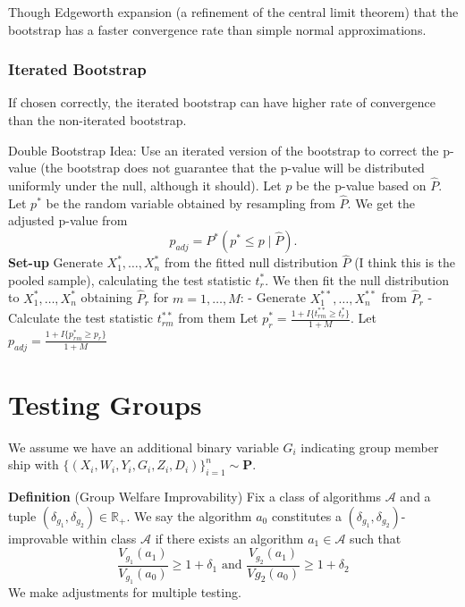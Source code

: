 \documentclass[
]{article}
\begin{document}
Though Edgeworth expansion (a refinement of the central limit theorem)
that the bootstrap has a faster convergence rate than simple normal
approximations.

\subsubsection{Iterated Bootstrap}\label{iterated-bootstrap}

If chosen correctly, the iterated bootstrap can have higher rate of
convergence than the non-iterated bootstrap.

Double Bootstrap Idea: Use an iterated version of the bootstrap to
correct the p-value (the bootstrap does not guarantee that the p-value
will be distributed uniformly under the null, although it should). Let
\(p\) be the p-value based on \(\hat{P}\). Let \(p^*\) be the random
variable obtained by resampling from \(\hat{P}\). We get the adjusted
p-value from \[
p_{adj} = P^*(p^* \leq p \mid \hat{P}).
\] \textbf{Set-up} Generate \(X^*_{1}, \dots, X^*_{n}\) from the fitted
null distribution \(\hat{P}\) (I think this is the pooled sample),
calculating the test statistic \(t_{r}^*\). We then fit the null
distribution to \(X^*_{1}, \dots, X^*_{n}\) obtaining \(\hat{P}_{r}\)
for \(m = 1,\dots, M\): - Generate \(X^{* *}_{1}, \dots, X^{* *}_{n}\)
from \(\hat{P}_{r}\) - Calculate the test statistic \(t^{* *}_{{rm}}\)
from them Let
\(p^*_{r} = \frac{1 + I\{ t^{* *}_{rm} \geq t_{r}^* \}}{1+M}\). Let
\(p_{adj} = \frac{1 + I\{ p^{* }_{rm} \geq p_{r} \}}{1+M}\)

\section{Testing Groups}\label{testing-groups}

We assume we have an additional binary variable \(G_{i}\) indicating
group member ship with
\(\{ (X_{i}, W_{i}, Y_{i}, G_{i}, Z_{i}, D_{i}) \}_{i=1}^n \sim \mathbf{P}\).

\textbf{Definition} (Group Welfare Improvability) Fix a class of
algorithms \(\mathcal{A}\) and a tuple
\((\delta_{g_{1}}, \delta_{g_{2}}) \in \mathbb{R}_{+}\). We say the
algorithm \(a_{0}\) constitutes a
\((\delta_{g_{1}}, \delta_{g_{2}})\)-improvable within class
\(\mathcal{A}\) if there exists an algorithm \(a_{1} \in \mathcal{A}\)
such that \[
\frac{V_{g_{1}}(a_{1})}{V_{g_{1}}(a_{0})} \geq 1+\delta_{1} \text{   and   } \frac{V_{g_{2}}(a_{1})}{V_{}{g_{2}}(a_{0})} \geq 1+\delta_{2}
\] We make adjustments for multiple testing.
\end{document}
